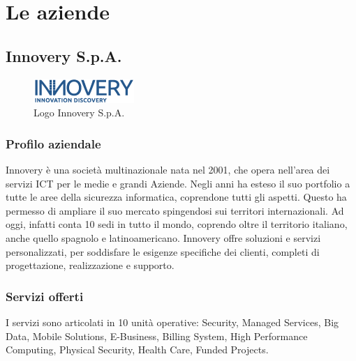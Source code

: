 \chapter{Le aziende}
\label{chap:aziende}
\section{Innovery S.p.A.}
\label{sec:innovery}

\begin{figure}
\begin{center}
\includegraphics[width=0.5\columnwidth]{images/logo_innovery.png}
\end{center}
\caption{Logo Innovery S.p.A.}
\label{fig:logo_innovery}
\end{figure}

\subsection{Profilo aziendale}
\label{subsec:innoprofilo}


Innovery è una società multinazionale nata nel 2001, che opera nell’area dei servizi ICT per le medie e grandi Aziende. Negli anni ha esteso il suo portfolio a tutte le aree della sicurezza informatica, coprendone tutti gli aspetti. Questo ha permesso di ampliare il suo mercato spingendosi sui territori internazionali. Ad oggi, infatti conta 10 sedi in tutto il mondo, coprendo oltre il territorio italiano, anche quello spagnolo e latinoamericano. Innovery offre soluzioni e servizi personalizzati, per soddisfare le esigenze specifiche dei clienti, completi di progettazione, realizzazione e supporto.\cite{innovery}


\subsection{Servizi offerti}
\label{subsec:innoservizi}
I servizi sono articolati in 10 unità operative: Security, Managed Services, Big Data, Mobile Solutions, E-Business, Billing  System, High  Performance  Computing, Physical  Security, Health Care, Funded  Projects. \cite{innoveryservizi} \\


